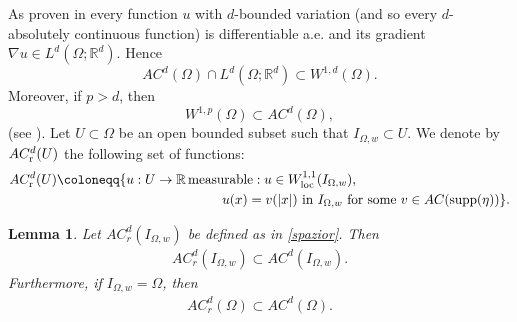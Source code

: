 \documentclass[11pt,leqno]{amsart}
\newtheorem{lem}[teo]{Lemma}
\theoremstyle{remark}
\theoremstyle{definition}
\theoremstyle{definition}
\newcommand{\supp}{\mathrm{supp}}
\newcommand{\bbR}{{\mathbb{R}}}
\newcommand{\R}{\bbR}
\begin{document}
As proven in \cite[Theorem 3.3]{Mal} every function $u$ with $d$-bounded variation (and so every $d$-absolutely continuous function) is differentiable a.e. and its gradient $\nabla u\in L^d(\Omega;\R^d)$. Hence
\begin{equation}\label{sobolev}
AC^{d}(\Omega)\cap L^d(\Omega;\R^d)\subset W^{1,d}(\Omega).
\end{equation}
Moreover, if $p>d$, then
\begin{equation}\label{ifp>d}
W^{1,p}(\Omega)\subset AC^{d}(\Omega),
\end{equation}
(see \cite[Theorem 4.1]{Mal}).
Let $U\subset \Omega$ be an open bounded subset such that $I_{\Omega,w}\subset U$. We denote by $AC_{{\rm r}}^{d}(U)$ the following set of functions:
\begin{align}
\label{spazior}
\begin{aligned}
AC_{{\rm r}}^{d}(U)\coloneqq &\{u: U\rightarrow \mathbb{R}\, \text{measurable}: u\in W^{1,1}_{\rm{loc}}(I_{\Omega,w}),\\
&\phantom{formulaformula}\text{$u(x)=v(\vert x\vert)$ in $I_{\Omega,w}$ for some $v\in AC({\supp(\eta)})$}\}.
\end{aligned}
\end{align} 
\begin{lem}\label{bvdspace}
Let $AC_{r}^{d}(I_{\Omega,w})$ be defined as in \eqref{spazior}. Then
\begin{align}
AC_{r}^{d}(I_{\Omega,w})\subset AC^{d}(I_{\Omega,w}).
\end{align}
Furthermore, if $I_{\Omega,w}=\Omega$, then 
\begin{align}
AC_{r}^{d}(\Omega)\subset AC^{d}(\Omega).
\end{align}
\end{lem}
\end{document}
